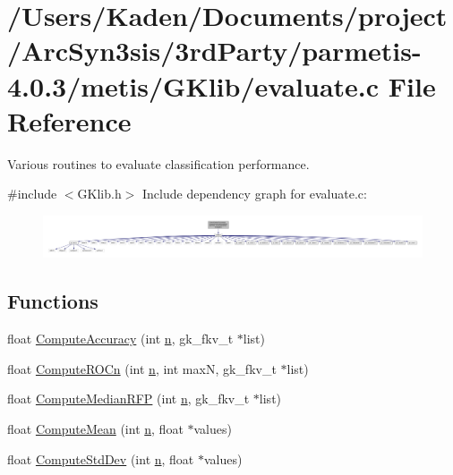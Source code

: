\hypertarget{a00029}{}\section{/\+Users/\+Kaden/\+Documents/project/\+Arc\+Syn3sis/3rd\+Party/parmetis-\/4.0.3/metis/\+G\+Klib/evaluate.c File Reference}
\label{a00029}


Various routines to evaluate classification performance.  


{\ttfamily \#include $<$G\+Klib.\+h$>$}\newline
Include dependency graph for evaluate.\+c\+:\nopagebreak
\begin{figure}[H]
\begin{center}
\leavevmode
\includegraphics[width=350pt]{a00030}
\end{center}
\end{figure}
\subsection*{Functions}
\begin{DoxyCompactItemize}
\item 
float \hyperlink{a00029_ae4d47a20b362605d1521159a9b090a04}{Compute\+Accuracy} (int \hyperlink{a00623_a781a04ab095280f838ff3eb0e51312e0}{n}, gk\+\_\+fkv\+\_\+t $\ast$list)
\item 
float \hyperlink{a00029_a8df1d3501976b7a3168df9f80ccf0cf6}{Compute\+R\+O\+Cn} (int \hyperlink{a00623_a781a04ab095280f838ff3eb0e51312e0}{n}, int maxN, gk\+\_\+fkv\+\_\+t $\ast$list)
\item 
float \hyperlink{a00029_a0712d76a8c05b906a790c20887ad1874}{Compute\+Median\+R\+FP} (int \hyperlink{a00623_a781a04ab095280f838ff3eb0e51312e0}{n}, gk\+\_\+fkv\+\_\+t $\ast$list)
\item 
float \hyperlink{a00029_aeeed505299d523a6061b0c1966d88427}{Compute\+Mean} (int \hyperlink{a00623_a781a04ab095280f838ff3eb0e51312e0}{n}, float $\ast$values)
\item 
float \hyperlink{a00029_a59fad97dedb62ff1ae0722de46318412}{Compute\+Std\+Dev} (int \hyperlink{a00623_a781a04ab095280f838ff3eb0e51312e0}{n}, float $\ast$values)
\end{DoxyCompactItemize}


